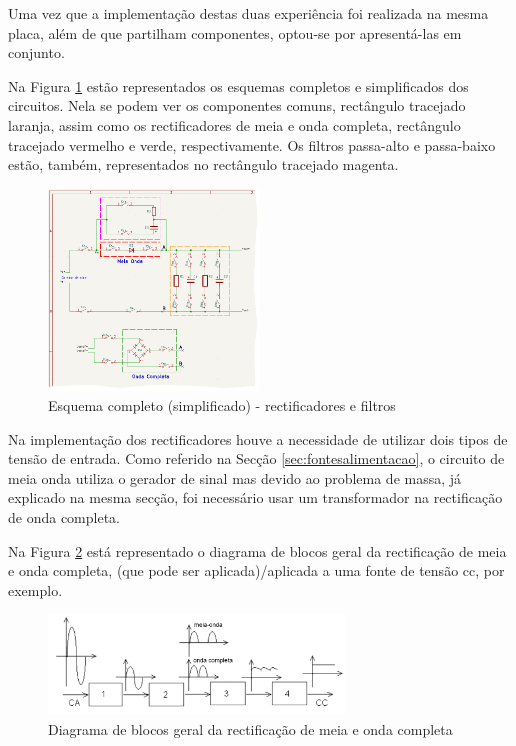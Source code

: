 Uma vez que a implementação destas duas experiência foi realizada na mesma placa, além de que partilham componentes, optou-se por apresentá-las em conjunto. 

Na Figura \ref{fig:rectificacao_filtragem_full} estão representados os esquemas completos e simplificados dos circuitos. Nela se podem ver os componentes comuns, rectângulo tracejado laranja, assim como os rectificadores de meia e onda completa, rectângulo tracejado vermelho e verde, respectivamente. Os filtros passa-alto e passa-baixo estão, também, representados no rectângulo tracejado magenta.

\begin{figure}[hbtp]
	\centering
	\includegraphics[width=0.5\textwidth]{figures/rec_fil_FULL.png}
	\caption{Esquema completo (simplificado) - rectificadores e filtros}
	\label{fig:rectificacao_filtragem_full}
\end{figure}

Na implementação dos rectificadores houve a necessidade de utilizar dois tipos de tensão de entrada. Como referido na Secção \ref{sec:fontesalimentacao}, o circuito de meia onda utiliza o gerador de sinal mas devido ao problema de massa, já explicado na mesma secção, foi necessário usar um transformador na rectificação de onda completa.

Na Figura \ref{fig:blocosrectificacao} está representado o diagrama de blocos geral da rectificação de meia e onda completa, (que pode ser aplicada)/aplicada a uma fonte de tensão \acrshort{cc}, por exemplo.

\begin{figure}[hbtp]
	\centering
	\includegraphics[width=0.7\textwidth]{figures/diagramablocosrectificacao.png}
	\caption{Diagrama de blocos geral da rectificação de meia e onda completa}
	\label{fig:blocosrectificacao}
\end{figure}

